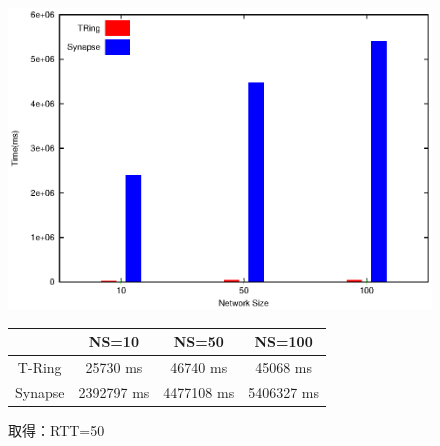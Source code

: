 \begin{figure}[htbp]
\begin{minipage}{1\textwidth}
    \centering
\includegraphics[width=14cm]{./images/compare_retrieve_rtt50.eps}
\begin{center}
  \begin{tabular}{|c||c|c|c|} \hline
  \backslashbox{}{} & NS=10 & NS=50 & NS=100  \\ \hline \hline
       T-Ring & 25730 ms & 46740 ms & 45068 ms  \\ \hline
       Synapse & 2392797  ms & 4477108 ms & 5406327 ms \\ \hline
  \end{tabular}
\end{center}
\caption{取得：RTT=50}
 \label{fig:compare_retrieve_rtt50}
 \end{minipage}
\end{figure}

